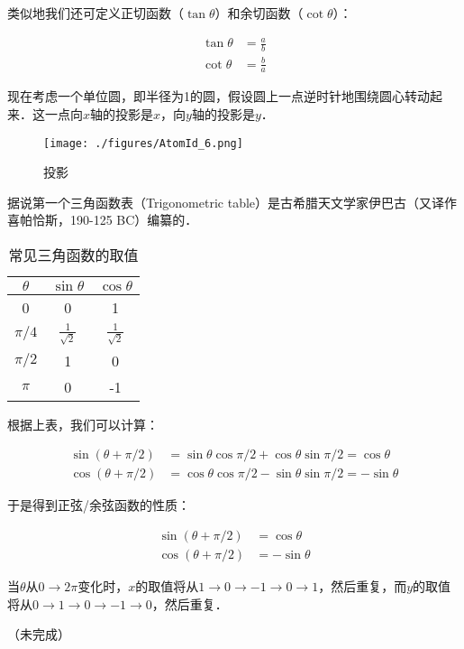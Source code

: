 类似地我们还可定义正切函数（$\tan \theta$）和余切函数（$\cot \theta$）：

\begin{equation}
\begin{aligned}
\tan \theta & = \frac{a}{b} \\
\cot \theta & = \frac{b}{a}
\end{aligned}
\end{equation}

现在考虑一个单位圆，即半径为1的圆，假设圆上一点逆时针地围绕圆心转动起来．这一点向$x$轴的投影是$x$，向$y$轴的投影是$y$．

\begin{figure}[ht]
\centering
\texttt{[image: ./figures/AtomId\_6.png]}
\caption{投影} \label{AtomId_fig6}
\end{figure}

据说第一个三角函数表（Trigonometric table）是古希腊天文学家伊巴古（又译作喜帕恰斯，190-125 BC）编纂的．

\begin{table}[ht]
\centering
\caption{常见三角函数的取值}\label{AtomId_tab2}
\begin{tabular}{|c|c|c|}
\hline
$\theta$ & $\sin \theta$ &  $\cos \theta$ \\
\hline
0  &  0 &  1 \\
\hline
$\pi/4$ & $\frac{1}{\sqrt 2}$  & $\frac{1}{\sqrt 2}$ \\
\hline
$\pi/2$ & 1  &  0 \\
\hline
$\pi$ & 0 & -1 \\
\hline
\end{tabular}
\end{table}

根据上表，我们可以计算：

\begin{equation}
\begin{aligned}
\sin ( \theta + \pi /2) & = \sin \theta \cos \pi /2 + \cos \theta  \sin \pi/2 = \cos \theta \\
\cos ( \theta + \pi /2) & = \cos  \theta \cos \pi /2 - \sin \theta \sin \pi/2 = - \sin \theta
\end{aligned}
\end{equation}

于是得到正弦/余弦函数的性质：

\begin{equation}
\begin{aligned}
\sin ( \theta + \pi /2 ) & = \cos \theta \\
\cos ( \theta + \pi /2) & = - \sin \theta
\end{aligned}
\end{equation}

当$\theta$从$0 \to 2\pi$变化时，$x$的取值将从$1 \to 0 \to -1 \to 0 \to 1$，然后重复，而$y$的取值将从$0 \to 1 \to 0 \to -1 \to 0$，然后重复．

（未完成）

